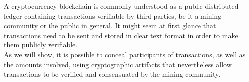 

A cryptocurrency blockchain is commonly understood as a public distributed ledger containing transactions verifiable by third parties, be it a mining community or the public in general. It might seem at first glance that transactions need to be sent and stored in clear text format in order to make them publicly verifiable.
\\ \newline
As we will show, it is possible to conceal participants of transactions, as well as the amounts involved, using cryptographic artifacts that nevertheless allow transactions to be verified and consensuated by the mining community.
